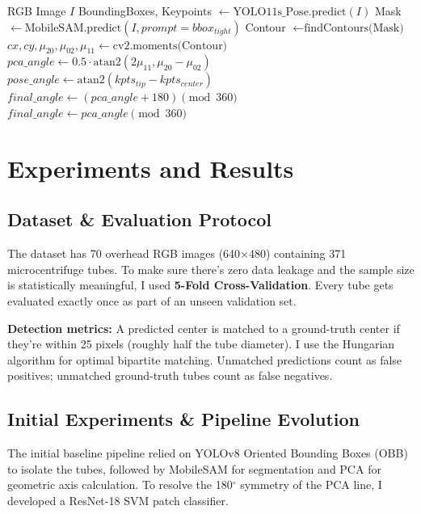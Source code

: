 \documentclass[11pt,a4paper]{article}
\begin{document}
\begin{algorithm}[H]
\caption{Refined Multi-Stage Pipeline Algorithm}
\begin{algorithmic}[1]
\REQUIRE RGB Image $I$
\STATE BoundingBoxes, Keypoints $\leftarrow \text{YOLO11s\_Pose.predict}(I)$
    \STATE Mask $\leftarrow \text{MobileSAM.predict}(I, prompt=bbox_{tight})$
    \STATE Contour $\leftarrow \text{findContours(Mask)}$
    \STATE $cx, cy, \mu_{20}, \mu_{02}, \mu_{11} \leftarrow \text{cv2.moments(Contour)}$
    \STATE $pca\_angle \leftarrow 0.5 \cdot \text{atan2}(2\mu_{11}, \mu_{20} - \mu_{02})$
    \STATE $pose\_angle \leftarrow \text{atan2}(kpts_{tip} - kpts_{center})$
        \STATE $final\_angle \leftarrow (pca\_angle + 180) \pmod{360}$
    \ELSE
        \STATE $final\_angle \leftarrow pca\_angle \pmod{360}$
    \ENDIF
\ENDFOR
\end{algorithmic}
\end{algorithm}

\section{Experiments and Results}

\subsection{Dataset \& Evaluation Protocol}
The dataset has 70 overhead RGB images (640$\times$480) containing 371 microcentrifuge tubes. To make sure there's zero data leakage and the sample size is statistically meaningful, I used \textbf{5-Fold Cross-Validation}. Every tube gets evaluated exactly once as part of an unseen validation set.

\textbf{Detection metrics:} A predicted center is matched to a ground-truth center if they're within 25 pixels (roughly half the tube diameter). I use the Hungarian algorithm for optimal bipartite matching. Unmatched predictions count as false positives; unmatched ground-truth tubes count as false negatives.

\subsection{Initial Experiments \& Pipeline Evolution}
The initial baseline pipeline relied on YOLOv8 Oriented Bounding Boxes (OBB) to isolate the tubes, followed by MobileSAM for segmentation and PCA for geometric axis calculation. To resolve the 180$^\circ$ symmetry of the PCA line, I developed a ResNet-18 SVM patch classifier. 
\end{document}
